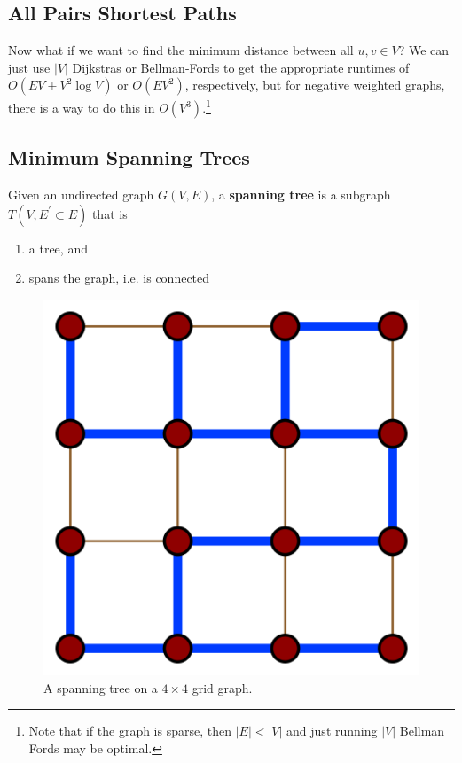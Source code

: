 \documentclass{article}
\begin{document}
  \subsection{All Pairs Shortest Paths} 

    Now what if we want to find the minimum distance between all $u, v \in V$? We can just use $|V|$ Dijkstras or Bellman-Fords to get the appropriate runtimes of $O(EV + V^2 \log{V})$ or $O(EV^2)$, respectively, but for negative weighted graphs, there is a way to do this in $O(V^3)$.\footnote{Note that if the graph is sparse, then $|E| < |V|$ and just running $|V|$ Bellman Fords may be optimal.}

  \subsection{Minimum Spanning Trees} 

      \begin{definition}
        Given an undirected graph $G(V, E)$, a \textbf{spanning tree} is a subgraph $T(V, E^\prime \subset E)$ that is 
        \begin{enumerate}
          \item a tree, and 
          \item spans the graph, i.e. is connected 
        \end{enumerate}

        \begin{figure}[H]
          \centering 
          \includegraphics[scale=0.3]{img/spanning_tree.png}
          \caption{A spanning tree on a $4 \times 4$ grid graph. } 
          \label{fig:spanning_tree}
        \end{figure}
      \end{definition}
\end{document}
